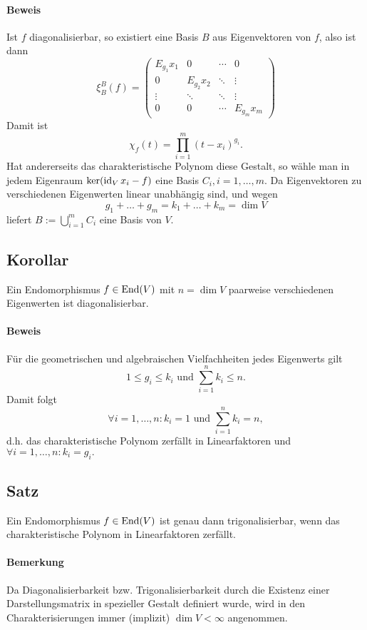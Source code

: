 \paragraph{Beweis}
	Ist $ f $ diagonalisierbar, so existiert eine Basis $ B $ aus Eigenvektoren von $ f $, also ist dann
		\[ \xi_B^B(f) =
			\begin{pmatrix}
				E_{g_1}x_1 &0& \cdots & 0 \\
				0 &E_{g_2}x_2& \ddots & \vdots\\
				\vdots & \ddots& \ddots & \vdots\\
				0 & 0 & \cdots & E_{g_m}x_m 
			\end{pmatrix} \]
	Damit ist
		\[ \chi_f(t)=\prod_{i=1}^{m}(t-x_i)^{g_i}. \]
	Hat andererseits das charakteristische Polynom diese Gestalt, so wähle man in jedem Eigenraum $ \ker(\operatorname{id}_Vx_i-f) $ eine Basis $ C_i,i=1,\dots,m $. Da Eigenvektoren zu verschiedenen Eigenwerten linear unabhängig sind, und wegen
		\[ g_1+\dots+g_m = k_1 + \dots + k_m = \dim V \]
	liefert $ B := \bigcup_{i=1}^mC_i $ eine Basis von $ V $.
\subsection{Korollar}
	\begin{Korollar}
		Ein Endomorphismus $ f\in\operatorname{End}(V) $ mit $ n=\dim V $ paarweise verschiedenen Eigenwerten ist diagonalisierbar.
	\end{Korollar}
\paragraph{Beweis}
	Für die geometrischen und algebraischen Vielfachheiten jedes Eigenwerts gilt
		\[ 1\leq g_i \leq k_i \text{ und } \sum_{i=1}^{n}k_i \leq n. \]
	Damit folgt
		\[ \forall i=1,\dots,n:k_i = 1 \text{ und } \sum_{i=1}^{n}k_i = n, \]
	d.h. das charakteristische Polynom zerfällt in Linearfaktoren und $ \forall i=1,\dots,n:k_i=g_i. $
\subsection{Satz}
\begin{Satz}
	Ein Endomorphismus $ f\in\operatorname{End}(V) $ ist genau dann trigonalisierbar, wenn das charakteristische Polynom in Linearfaktoren zerfällt.
\end{Satz}
\paragraph{Bemerkung}
	Da Diagonalisierbarkeit bzw. Trigonalisierbarkeit durch die Existenz einer Darstellungsmatrix in spezieller Gestalt definiert wurde, wird in den Charakterisierungen immer (implizit) $ \dim V < \infty $ angenommen.
